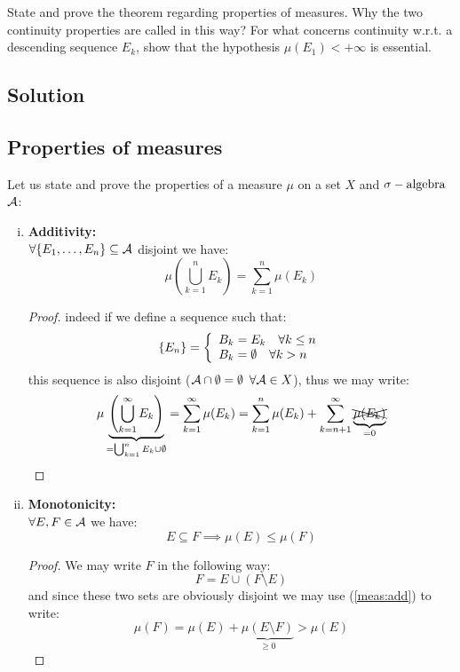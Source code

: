\question
State and prove the theorem regarding properties of measures. Why the two continuity properties
are called in this way? For what concerns continuity w.r.t. a descending sequence ${E_k}$, show that
the hypothesis $\mu(E_1) < +\infty$ is essential.

\subsection*{Solution}
\subsection{Properties of measures}
Let us state and prove the properties of a measure $\mu$ on a set $X$ and $\sigma-\text{algebra}$ $\mathcal{A}$:
\begin{enumerate}[i)]
    \item \label{meas:add} \textbf{Additivity:} \\
    $\forall \{ E_1, \dots, E_n \} \subseteq \mathcal{A}$ disjoint we have:
    \[
        \mu\left( \bigcup_{k=1}^{n} E_k \right) = \sum_{k=1}^{n} \mu(E_k)
    \]
    \begin{proof}
    indeed if we define a sequence such that:
    \[
        \{ E_n \} = \left\{ \begin{array}{l}
            B_k = E_k \quad \forall k \leq n\\
            B_k = \emptyset \quad \forall k > n
        \end{array} \right.
    \]
    this sequence is also disjoint ($\mathcal{A}\cap\emptyset = \emptyset$ $\forall \mathcal{A}\in X$), thus we may write:
    \[
        \mu \underbrace{ \left( \bigcup_{k=1}^{\infty} E_k \right) }_{=\bigcup_{k=1}^{n} E_k \cup \emptyset}
         = \sum_{k=1}^{\infty} \mu(E_k) = \sum_{k=1}^{n} \mu(E_k) + \sum_{k=n+1}^{\infty} \underbrace{\overset{\text{\normalsize}}{\xcancel{\mu(E_k)}}}_{=0}
    \]
    \end{proof}

    \item \label{meas:mono} \textbf{Monotonicity:} \\
    $\forall E,F \in \mathcal{A}$ we have:
    \[
        E\subseteq F \implies \mu(E) \leq \mu(F)    
    \]
    \begin{proof}
    We may write $F$ in the following way:
    \[
        F=E\cup (F \setminus E) 
    \]
    and since these two sets are obviously disjoint we may use (\ref{meas:add}) to write:
    \[
        \mu(F) = \mu(E)+\underbrace{\mu(E \setminus F)}_{\geq 0} > \mu(E)
    \]
    \end{proof}
    

\end{enumerate}
